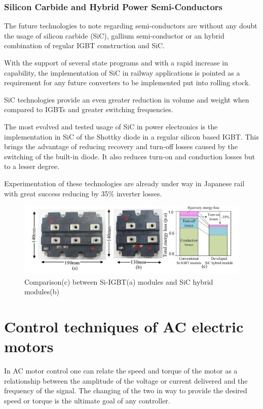 \subsubsection{Silicon Carbide and Hybrid Power Semi-Conductors}
The future technologies to note regarding semi-conductors are without any doubt the usage of silicon carbide (SiC), gallium semi-conductor or an hybrid combination of regular IGBT construction and SiC.

With the support of several state programs and with a rapid increase in capability, the implementation of SiC in railway applications is pointed as a requirement for any future converters to be implemented put into rolling stock.

SiC technologies provide an even greater reduction in volume and weight when compared to IGBTs and greater switching frequencies. 

The most evolved and tested usage of SiC in power electronics is the implementation in SiC of the Shottky diode in a regular silicon based IGBT. This brings the advantage of reducing recovery and turn-off losses caused by the switching of the built-in diode. It also reduces turn-on and conduction losses but to a lesser degree. 

Experimentation of these technologies are already under way in Japanese rail with great success reducing by 35\% inverter losses\cite{MainSOTA}.

\begin{figure}[h]
    \centering
    \includegraphics{Figures/SivSiC.jpg}
    \caption{Comparison(c) between Si-IGBT(a) modules and SiC hybrid modules(b)}
    \label{fig:SiVSiC}
\end{figure}

\section{Control techniques of AC electric motors}
In AC motor control one can relate the speed and torque of the motor as a relationship between the amplitude of the voltage or current delivered and the frequency of the signal. The changing of the two in way to provide the desired speed or torque is the ultimate goal of any controller.

